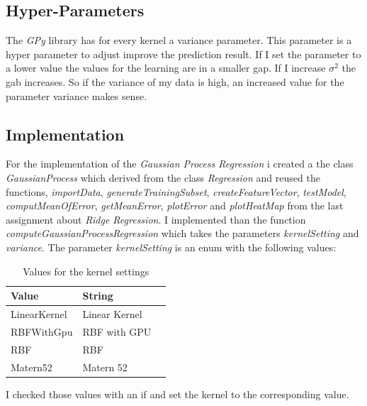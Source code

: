 \documentclass[10pt, a4paper, twocolumn]{article} %
\begin{document}
\subsection{Hyper-Parameters}
The \textit{GPy} library has for every kernel a variance parameter. This parameter is a hyper parameter to adjust improve the prediction result. If I set the parameter to a lower value the values for the learning are in a smaller gap. If I increase $\sigma^2$ the gab increases. So if the variance of my data is high, an increased value for the parameter variance makes sense.

\subsection{Implementation}
For the implementation of the \textit{Gaussian Process Regression} i created a the class \textit{GaussianProcess} which derived from the class \textit{Regression} and reused the functions, \textit{importData}, \textit{generateTrainingSubset}, \textit{createFeatureVector}, \textit{testModel}, \textit{computMeanOfError}, \textit{getMeanError}, \textit{plotError} and \textit{plotHeatMap} from the last assignment about \textit{Ridge Regression}. I implemented than the function \textit{computeGaussianProcessRegression} which takes the parameters \textit{kernelSetting} and \textit{variance}. The parameter \textit{kernelSetting} is an enum with the following values: 
\begin{table}[htbp]
    \label{tab:kernelSettings}
	\caption{Values for the kernel settings}
	\centering
	\begin{tabular}{llr}
		\cmidrule(r){1-2}
		Value & String \\
		\midrule
		LinearKernel & Linear Kernel \\
		RBFWithGpu & RBF with GPU \\
		RBF & RBF \\				
		Matern52 & Matern 52 \\
		\bottomrule
	\end{tabular}
\end{table}
I checked those values with an if and set the kernel to the corresponding value.
\end{document}
